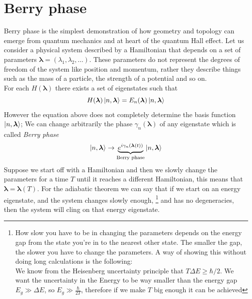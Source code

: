 \section{Berry phase}
    Berry phase is the simplest demonstration of how geometry and topology can emerge from quantum mechanics and at heart of the quantum Hall effect.\newline
    Let us consider a physical system described by a Hamiltonian that depends on a set of parameters $\boldsymbol \lambda=(\lambda_1,\lambda_2,\dots)$. These parameters do not represent the degrees of freedom of the system like position and momentum, rather they describe things such as the mass of a particle, the strength of a potential and so on.\\ For each $H(\boldsymbol \lambda)$ there exists a set of eigenstates such that 
    \begin{equation}
        H(\boldsymbol \lambda)\ket{n,\boldsymbol \lambda}=E_n(\boldsymbol \lambda)\ket{n,\boldsymbol \lambda}
    \end{equation}
    However the equation above does not completely determine the basis function $\ket{n,\boldsymbol \lambda}$; We can change arbitrarily the phase $\gamma_n(\boldsymbol \lambda)$ of any eigenstate which is called \textit{Berry phase}
    \begin{equation}
        \label{eq:berryphase}
        \ket{n,\boldsymbol \lambda}\to \underbrace{e^{i\gamma_n(\boldsymbol \lambda (t))}}_{\textrm{Berry phase}} \ket{n,\boldsymbol \lambda}  
    \end{equation}
    Suppose we start off with a Hamiltonian and then we slowly change the parameters for a time $T$ until it reaches a different Hamiltonian, this means that $\boldsymbol \lambda=\boldsymbol \lambda(T)$. For the adiabatic theorem we can say that if we start on an energy eigenstate, and the system changes slowly enough,
    \footnote{How slow you have to be in changing the parameters depends on the energy gap from the state you're in to the nearest other state. The smaller the gap, the slower you have to change the parameters. A way of showing this without doing long calculations is the following: \\ We know from the Heisenberg uncertainty principle that $T \Delta E \ge \hbar/2$. We want the uncertainty in the Energy to be way smaller than the energy gap $E_g \gg\Delta E$, so $E_g \gg \frac{\hbar}{2T}$, therefore if we make $T$ big enough it can be achieved}
    and has no degeneracies, then the system will cling on that energy eigenstate.\newline
